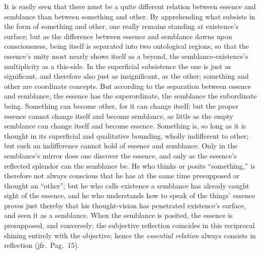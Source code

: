 \documentclass[12pt]{book}
\begin{document}
It is easily seen that there must be a quite different relation between
essence and semblance than between something and other. By apprehending what
subsists in the form of something and other, one really remains standing at
existence's surface; but as the difference between essence and semblance
dawns upon consciousness, being itself is separated into two ontological
regions, so that the essence's unity most nearly shows itself as a beyond,
the semblance-existence's multiplicity as a this-side. In the superficial
subsistence the one is just as significant, and therefore also just as
insignificant, as the other; something and other are coordinate concepts.
But according to the separation between essence and semblance, the essence
has the superordinate, the semblance the subordinate being. Something can
become other, for it can change itself; but the proper essence cannot change
itself and become semblance, as little as the empty semblance can change
itself and become essence. Something is, so long as it is thought in its
superficial and qualitative bounding, wholly indifferent to other; but such
an indifference cannot hold of essence and semblance. Only in the semblance's
mirror does one discover the essence, and only as the essence's reflected
splendor can the semblance be. He who thinks or posits ``something,'' is
therefore not always conscious that he has at the same time presupposed or
thought an ``other''; but he who calls existence a semblance has already
caught sight of the essence, and he who understands how to speak of the
things' essence proves just thereby that his thought-vision has penetrated
existence's surface, and seen it as a semblance. When the semblance is
posited, the essence is presupposed, and conversely; the subjective
reflection coincides in this reciprocal shining entirely with the objective;
hence the \emph{essential relation} always consists in reflection (jfr.\
Pag.\ 15).
\end{document}
